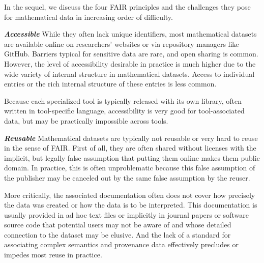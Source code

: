 In the sequel, we discuss the four FAIR principles and the challenges they pose for mathematical data in increasing order of difficulty.

\medskip

\noindent\textbf{\emph{Accessible}}
While they often lack unique identifiers, most mathematical datasets are available online on researchers' websites or via repository managers like GitHub.
Barriers typical for sensitive data are rare, and open sharing is common.
However, the level of accessibility desirable in practice is much higher due to the wide variety of internal structure in mathematical datasets.
Access to individual entries or the rich internal structure of these entries is less common.

Because each specialized tool is typically released with its own library, often written in tool-specific language, accessibility is very good for tool-associated data, but may be practically impossible across tools.



\medskip

\textbf{\emph{Reusable}}
Mathematical datasets are typically not reusable or very hard to reuse in the sense of FAIR.
First of all, they are often shared without licenses with the implicit, but legally false assumption that putting them online makes them public domain.
In practice, this is often unproblematic because this false assumption of the publisher may be canceled out by the same false assumption by the reuser.

More critically, the associated documentation often does not cover how precisely the data was created or how the data is to be interpreted.
This documentation is usually provided in ad hoc text files or implicitly in journal papers or software source code that potential users may not be aware of and whose detailed connection to the dataset may be elusive.
And the lack of a standard for associating complex semantics and provenance data effectively precludes or impedes most reuse in practice.

